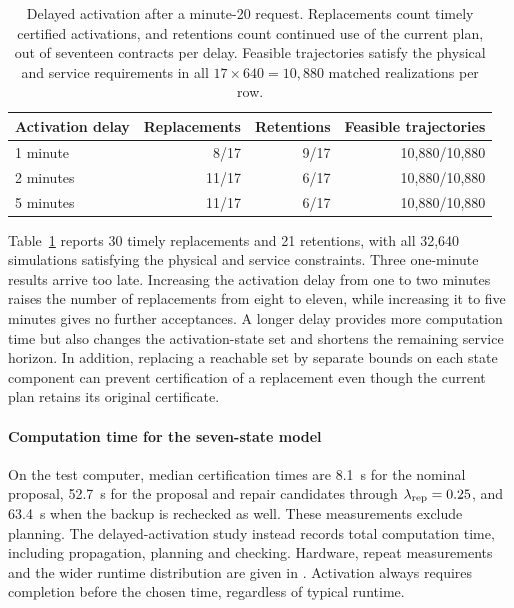 \begin{table}[!htbp]
\centering\small
\setlength{\belowcaptionskip}{6pt}
\caption{Delayed activation after a minute-20 request. Replacements count
timely certified activations, and retentions count continued use of the
current plan, out of seventeen contracts per delay. Feasible trajectories
satisfy the physical and service requirements in all
$17\times640=10{,}880$ matched realizations per row.}
\label{tab:delayed-handover}
\setlength{\tabcolsep}{4pt}
\begin{tabular}{@{}lrrr@{}}
\toprule
Activation delay & Replacements & Retentions & Feasible trajectories\\
\midrule
1 minute & 8/17 & 9/17 & 10,880/10,880\\
2 minutes & 11/17 & 6/17 & 10,880/10,880\\
5 minutes & 11/17 & 6/17 & 10,880/10,880\\
\bottomrule
\end{tabular}
\end{table}

Table~\ref{tab:delayed-handover} reports 30 timely replacements and
21 retentions, with all 32,640 simulations satisfying the physical and service
constraints. Three one-minute results arrive too late. Increasing the activation delay
from one to two minutes raises the number of replacements from eight to
eleven, while increasing it to five minutes gives no further acceptances.
A longer delay provides more computation time but also changes the
activation-state set and shortens the remaining service horizon.
In addition, replacing a reachable set by separate bounds on each state component can prevent
certification of a replacement even though the current plan retains its
original certificate.

\paragraph{Computation time for the seven-state model}
On the test computer, median certification times are 8.1~s for the
nominal proposal, 52.7~s for the proposal and repair candidates through
$\lambda_{\rm rep}=0.25$, and 63.4~s when the backup is rechecked as well.
These measurements exclude planning. The delayed-activation study instead
records total computation time, including propagation, planning and
checking. Hardware, repeat measurements and the wider runtime distribution
are given in . Activation always requires
completion before the chosen time, regardless of typical runtime.


